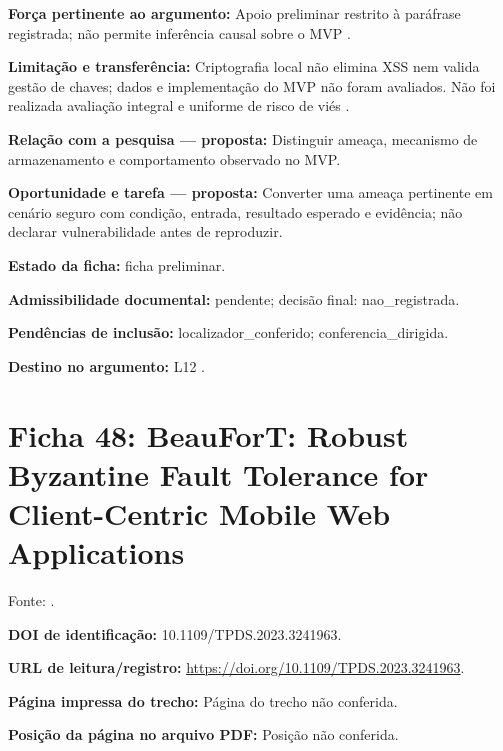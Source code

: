 \noindent\textbf{Força pertinente ao argumento:} Apoio preliminar restrito à paráfrase registrada; não permite inferência causal sobre o MVP \citep{OS09}.\par\medskip

\noindent\textbf{Limitação e transferência:} Criptografia local não elimina XSS nem valida gestão de chaves; dados e implementação do MVP não foram avaliados. Não foi realizada avaliação integral e uniforme de risco de viés \citep{OS09}.\par\medskip

\noindent\textbf{Relação com a pesquisa — proposta:} Distinguir ameaça, mecanismo de armazenamento e comportamento observado no MVP.\par\medskip

\noindent\textbf{Oportunidade e tarefa — proposta:} Converter uma ameaça pertinente em cenário seguro com condição, entrada, resultado esperado e evidência; não declarar vulnerabilidade antes de reproduzir.\par\medskip

\noindent\textbf{Estado da ficha:} ficha preliminar.\par\medskip

\noindent\textbf{Admissibilidade documental:} pendente; decisão final: nao\_registrada.\par\medskip

\noindent\textbf{Pendências de inclusão:} localizador\_conferido; conferencia\_dirigida.\par\medskip

\noindent\textbf{Destino no argumento:} L12 .

\clearpage\section*{Ficha 48: BeauForT: Robust Byzantine Fault Tolerance for Client-Centric Mobile Web Applications}

Fonte: \citet{OS10}.

\noindent\textbf{DOI de identificação:} 10.1109/TPDS.2023.3241963.\par\medskip

\noindent\textbf{URL de leitura/registro:} \url{https://doi.org/10.1109/TPDS.2023.3241963}.\par\medskip

\noindent\textbf{Página impressa do trecho:} Página do trecho não conferida.\par\medskip

\noindent\textbf{Posição da página no arquivo PDF:} Posição não conferida.\par\medskip

